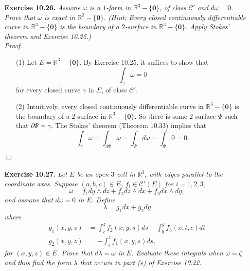 \documentclass{article}
\begin{document}



\textbf{Exercise 10.26.}
\emph{Assume $\omega$ is a $1$-form in $\mathbb{R}^3 - \{\mathbf{0}\}$,
of class $\mathscr{C}'$ and $d\omega = 0$.
Prove that $\omega$ is exact in $\mathbb{R}^3 - \{\mathbf{0}\}$.
(Hint: Every closed continuously differentiable curve in $\mathbb{R}^3 - \{\mathbf{0}\}$
is the boundary of a $2$-surface in $\mathbb{R}^3 - \{\mathbf{0}\}$.
Apply Stokes' theorem and Exercise 10.25.)} \\



\emph{Proof.}
\begin{enumerate}
\item[(1)]
  Let $E = \mathbb{R}^3 - \{\mathbf{0}\}$.
  By Exercise 10.25,
  it suffices to show that
  \[
    \int_{\gamma} \omega = 0
  \]
  for every closed curve $\gamma$ in $E$, of class $\mathscr{C}'$.

\item[(2)]
  Intuitively, every closed continuously differentiable curve in $\mathbb{R}^3 - \{\mathbf{0}\}$
  is the boundary of a $2$-surface in $\mathbb{R}^3 - \{\mathbf{0}\}$.
  So there is some $2$-surface $\Psi$ such that $\partial \Psi = \gamma$.
  The Stokes' theorem (Theorem 10.33) implies that
  \[
    \int_{\gamma} \omega
    = \int_{\partial \Psi} \omega
    = \int_{\Psi} d\omega
    = \int_{\Psi} 0
    = 0.
  \]
\end{enumerate}
$\Box$ \\\\









\textbf{Exercise 10.27.}
\emph{Let $E$ be an open $3$-cell in $\mathbb{R}^3$,
with edges parallel to the coordinate axes.
Suppose $(a,b,c) \in E$, $f_i \in \mathscr{C}'(E)$ for $i=1,2,3$,
\[
  \omega
  = f_1 dy \wedge dz + f_2 dz \wedge dx + f_3 dx \wedge dy,
\]
and assume that $d\omega = 0$ in $E$.
Define
\[
  \lambda = g_1 dx + g_2 dy
\]
where
\begin{align*}
  g_1(x,y,z) &= \int_{c}^{z} f_2(x,y,s) ds - \int_{b}^{y} f_3(x,t,c)dt \\
  g_2(x,y,z) &= - \int_{c}^{z} f_1(x,y,s) ds,
\end{align*}
for $(x,y,z) \in E$.
Prove that $d\lambda = \omega$ in $E$.
Evaluate these integrals when $\omega = \zeta$ and thus find the form $\lambda$
that occurs in part (e) of Exercise 10.22.} \\
\end{document}
